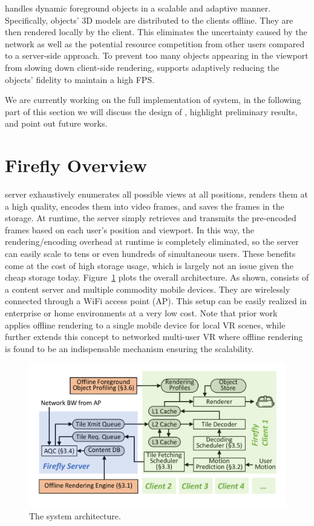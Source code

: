 \BULLET \firefly handles dynamic foreground objects in a scalable and adaptive manner.
Specifically, objects' 3D models are distributed to the clients offline.
They are then rendered locally by the client. This eliminates the uncertainty caused by the network as well as the potential resource competition from other users compared to a server-side approach.
To prevent too many objects appearing in the viewport from slowing down client-side rendering, \firefly supports adaptively reducing the objects' fidelity to maintain a high FPS.

We are currently working on the full implementation of \firefly system, in the following part of this section we will discuss the design of \firefly, highlight preliminary results, and point out future works. 

\section{Firefly Overview}

\firefly server exhaustively enumerates all possible views at all positions, renders them at a high quality, encodes them into video frames, and saves the frames in the storage.
%
At runtime, the server simply retrieves and transmits the pre-encoded frames based on each user's position and viewport. In this way, the rendering/encoding overhead at runtime is completely eliminated, so the server can easily scale to tens or even hundreds of simultaneous users. These benefits come at the cost of high storage usage, which is largely not an issue given the cheap storage today.
%
Figure~\ref{fig:system_design} plots the overall architecture. As shown, \firefly consists of a content server and multiple commodity mobile devices. %
They are wirelessly connected through a WiFi access point (AP). This setup can be easily realized in enterprise or home environments at a very low cost.
%
Note that prior work~\cite{boos2016flashback} applies offline rendering to a single mobile device for local VR scenes, while \firefly further extends this concept to networked multi-user VR where offline rendering is found to be an indispensable mechanism ensuring the scalability.

\begin{figure}[t]
	\centering
	\includegraphics[width=.8\textwidth]{figs/firefly/arch.pdf}
	\caption{The \firefly system architecture.}
	\label{fig:system_design}
	\vspace{-.2in}
\end{figure}

